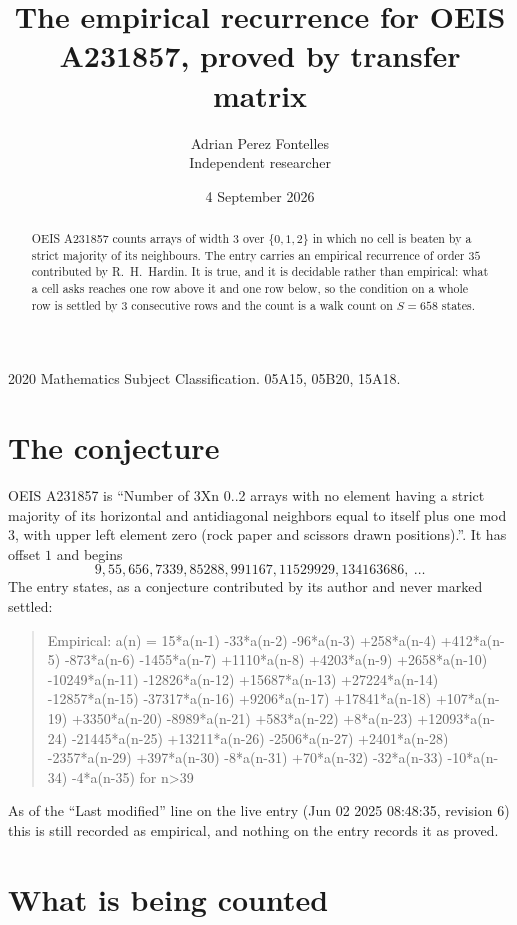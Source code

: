 \documentclass[11pt,a4paper]{article}
\title{The empirical recurrence for OEIS A231857, proved by transfer matrix}
\author{Adrian Perez Fontelles\\ \small Independent researcher}
\date{4 September 2026}
\theoremstyle{plain}
\theoremstyle{definition}
\begin{document}
\maketitle

\begin{abstract}
OEIS A231857 counts arrays of width $3$ over $\{0,1,2\}$ in which no cell is beaten by a strict majority of its neighbours. The entry carries an
empirical recurrence of order $35$ contributed by R.~H.~Hardin. It is true, and it is
decidable rather than empirical: what a cell asks reaches one row above
it and one row below, so the condition on a whole row is settled by
$3$ consecutive rows and the count is a walk count on $S=658$ states.
\end{abstract}

\noindent\small 2020 Mathematics Subject Classification. 05A15, 05B20, 15A18.\normalsize

\section{The conjecture}

OEIS A231857 is ``Number of 3Xn 0..2 arrays with no element having a strict majority of its horizontal and antidiagonal neighbors equal to itself plus one mod 3, with upper left element zero (rock paper and scissors drawn positions).''. It has offset $1$ and begins
\[
9, 55, 656, 7339, 85288, 991167, 11529929, 134163686,\ \dots
\]
The entry states, as a conjecture contributed by its author and never marked settled:
\begin{quote}
Empirical: a(n) = 15*a(n-1) -33*a(n-2) -96*a(n-3) +258*a(n-4) +412*a(n-5) -873*a(n-6) -1455*a(n-7) +1110*a(n-8) +4203*a(n-9) +2658*a(n-10) -10249*a(n-11) -12826*a(n-12) +15687*a(n-13) +27224*a(n-14) -12857*a(n-15) -37317*a(n-16) +9206*a(n-17) +17841*a(n-18) +107*a(n-19) +3350*a(n-20) -8989*a(n-21) +583*a(n-22) +8*a(n-23) +12093*a(n-24) -21445*a(n-25) +13211*a(n-26) -2506*a(n-27) +2401*a(n-28) -2357*a(n-29) +397*a(n-30) -8*a(n-31) +70*a(n-32) -32*a(n-33) -10*a(n-34) -4*a(n-35) for n>39
\end{quote}
As of the ``Last modified'' line on the live entry (Jun 02 2025 08:48:35, revision 6) this is still
recorded as empirical, and nothing on the entry records it as proved.

\section{What is being counted}
\end{document}
